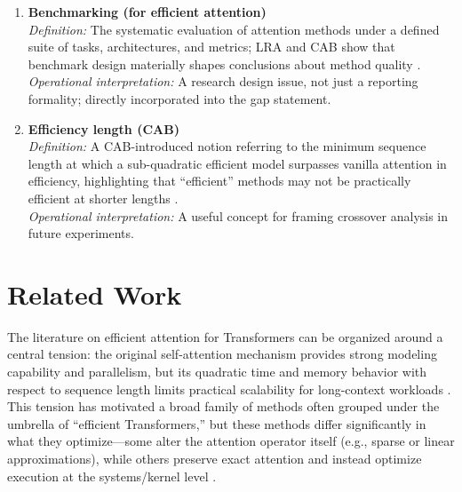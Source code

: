\documentclass[12pt, a4paper]{article}
\begin{document}
\begin{enumerate}
\item \textbf{Benchmarking (for efficient attention)} \\
\textit{Definition:} The systematic evaluation of attention methods under a defined suite of tasks, architectures, and metrics; LRA and CAB show that benchmark design materially shapes conclusions about method quality \parencite{tay2020longrangearenabenchmark, zhang2025cabcomprehensiveattentionbenchmarking}. \\
\textit{Operational interpretation:} A research design issue, not just a reporting formality; directly incorporated into the gap statement.

\item \textbf{Efficiency length (CAB)} \\
\textit{Definition:} A CAB-introduced notion referring to the minimum sequence length at which a sub-quadratic efficient model surpasses vanilla attention in efficiency, highlighting that ``efficient'' methods may not be practically efficient at shorter lengths \parencite{zhang2025cabcomprehensiveattentionbenchmarking}. \\
\textit{Operational interpretation:} A useful concept for framing crossover analysis in future experiments.

\end{enumerate}


\section{Related Work}

The literature on efficient attention for Transformers can be organized around a central tension: the original self-attention mechanism provides strong modeling capability and parallelism, but its quadratic time and memory behavior with respect to sequence length limits practical scalability for long-context workloads \parencite{vaswani2023attentionneed, 10.1145/3530811}. This tension has motivated a broad family of methods often grouped under the umbrella of ``efficient Transformers,'' but these methods differ significantly in what they optimize---some alter the attention operator itself (e.g., sparse or linear approximations), while others preserve exact attention and instead optimize execution at the systems/kernel level \parencite{10.1145/3530811}.
\end{document}
